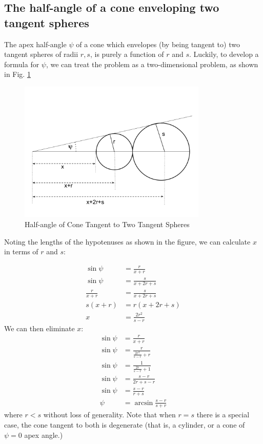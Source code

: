 \documentclass{article}
\begin{document}
\subsection{The half-angle of a cone enveloping two tangent spheres}

The apex half-angle $\psi$ of a cone which envelopes (by being tangent to) two tangent
spheres of radii $r,s$, is purely a function of $r$ and $s$.
Luckily, to develop a formula for $\psi$, we can treat the problem as a two-dimensional problem,
as shown in Fig. \ref{fig:conehalf}


\begin{figure}
     \centering
     \includegraphics[width=0.8\textwidth]{figures/HalfAngleOfConeTangenttoTwoTangentSpheres.png}
     \caption{Half-angle of Cone Tangent to Two Tangent Spheres}
  \label{fig:conehalf}
\end{figure}

Noting the lengths of the hypotenuses as shown in the figure, we
can calculate $x$ in terms of $r$ and $s$:

\begin{align}
  \sin{\psi} &= \frac{r}{x + r} \\
  \sin{\psi} &= \frac{s}{x + 2r + s} \\
  \frac{r}{x + r} &= \frac{s}{x + 2r + s} \\
  s(x + r) &= r(x + 2r + s) \\
  x &= \frac{2r^2}{s - r}
\end{align}
We can then eliminate $x$:
\begin{align}
  \sin{\psi} &= \frac{r}{x + r} \\
  \sin{\psi} &= \frac{r}{\frac{2r^2}{s - r} + r} \\
    \sin{\psi} &= \frac{1}{\frac{2r}{s - r} + 1} \\
      \sin{\psi} &= \frac{s-r}{2r + s - r} \\
    \sin{\psi} &= \frac{s-r}{r + s} \\
 \psi &= \arcsin{\frac{s - r}{s + r}}
\end{align}
where $r < s$ without loss of generality. Note that when $r = s$
there is a special case,
the cone tangent to both is degenerate (that is, a cylinder, or a cone of
$\psi = 0$ apex angle.)
\end{document}

